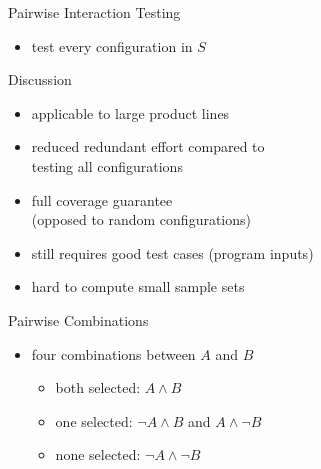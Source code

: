 \begin{frame}{\myframetitle{} }
\begin{mycolumns}
\begin{definition}{Pairwise Interaction Testing}
\begin{itemize}
				\item test every configuration in $S$
			\end{itemize}
		\end{definition}
	\mynextcolumn
		\pause
		\begin{note}{Discussion}
			\begin{itemize}
				\setlength\itemsep{.4em}
				\item applicable to large product lines
				\item reduced redundant effort compared to\\testing all configurations
				\item full coverage guarantee\\(opposed to random configurations)
				\vspace*{1ex}
				\item still requires good test cases (program inputs)
				\item hard to compute small sample sets
			\end{itemize}
		\end{note}
		\pause
		\begin{definition}{Pairwise Combinations}
			\begin{itemize}
				\setlength\itemsep{.5em}
				\item four combinations between $A$ and $B$
				\begin{itemize}
					\item both selected: $A \wedge B$
					\item one selected: $\neg A \wedge B$ and $A \wedge \neg B$
					\item none selected: $\neg A \wedge \neg B$
				\end{itemize}
				\end{itemize}
		\end{definition}
	\end{mycolumns}
\end{frame}

\newcommand{\pair}[2]{$#1 \wedge #2$ & $#1 \wedge \neg #2$ & $\neg #1 \wedge #2$ & $\neg #1 \wedge \neg #2$\\}
\newcommand{\epairone}[6]{
	\alt<#5->{\textcolor{#3}{$#1 \wedge #2$}}{$#1 \wedge #2$} & 
	\alt<#6->{\textcolor{#4}{$\neg #1 \wedge #2$}}{$\neg #1 \wedge #2$} & 
}
\newcommand{\epairtwo}[6]{
	\alt<#5->{\textcolor{#3}{$#1 \wedge \neg #2$}}{$#1 \wedge \neg #2$} & 
	\alt<#6->{\textcolor{#4}{$\neg #1 \wedge \neg #2$}}{$\neg #1 \wedge \neg #2$} \\
}


